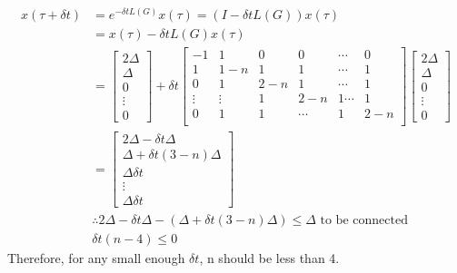 \documentclass{article}
\begin{document}
\begin{problem}
    \begin{align*}
        x (\tau + \delta t) &= e^{-\delta t L(G)}  x(\tau) =(I - \delta t L(G))x(\tau)\\
        &=x(\tau) - \delta t L(G) x(\tau)\\
        &= \begin{bmatrix*}
            2 \Delta \\
            \Delta\\
            0\\
            \vdots\\
            0
        \end{bmatrix*} + 
        \delta t \begin{bmatrix*}
            -1 & 1 & 0 & 0 & \cdots &0 \\
             1 & 1-n & 1 & 1 & \cdots & 1\\
             0 & 1 & 2-n & 1 & \cdots & 1 \\
             \vdots & \vdots & 1&2-n &1 \cdots &1\\
             0& 1&1&\cdots &1&2-n\\
        \end{bmatrix*} 
        \begin{bmatrix*}
            2 \Delta \\
            \Delta\\
            0\\
            \vdots\\
            0
        \end{bmatrix*} \\
        &= \begin{bmatrix*}
            2\Delta - \delta t \Delta\\
            \Delta +  \delta t (3-n)\Delta\\
            \Delta \delta t\\
            \vdots\\
            \Delta \delta t
        \end{bmatrix*}\\
        &\therefore 2\Delta - \delta t \Delta -(\Delta +  \delta t (3-n)\Delta) \leq \Delta \text{ to be connected}\\
        &\delta t (n-4) \leq 0
    \end{align*} 
    Therefore, for any small enough $\delta t$, n should be less than 4. 
\end{problem}
\newpage
\end{document}
